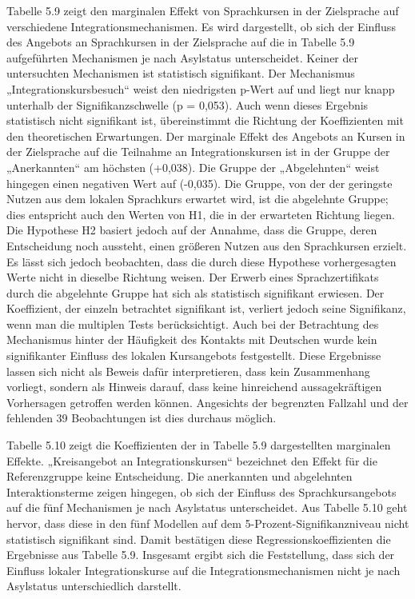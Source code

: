 Tabelle 5.9 zeigt den marginalen Effekt von Sprachkursen in der Zielsprache auf verschiedene Integrationsmechanismen. Es wird dargestellt, ob sich der Einfluss des Angebots an Sprachkursen in der Zielsprache auf die in Tabelle 5.9 aufgeführten Mechanismen je nach Asylstatus unterscheidet. Keiner der untersuchten Mechanismen ist statistisch signifikant. Der Mechanismus „Integrationskursbesuch“ weist den niedrigsten p-Wert auf und liegt nur knapp unterhalb der Signifikanzschwelle (p = 0,053). Auch wenn dieses Ergebnis statistisch nicht signifikant ist, übereinstimmt die Richtung der Koeffizienten mit den theoretischen Erwartungen. Der marginale Effekt des Angebots an Kursen in der Zielsprache auf die Teilnahme an Integrationskursen ist in der Gruppe der „Anerkannten“ am höchsten (+0,038). Die Gruppe der „Abgelehnten“ weist hingegen einen negativen Wert auf (-0,035). Die Gruppe, von der der geringste Nutzen aus dem lokalen Sprachkurs erwartet wird, ist die abgelehnte Gruppe; dies entspricht auch den Werten von H1, die in der erwarteten Richtung liegen. Die Hypothese H2 basiert jedoch auf der Annahme, dass die Gruppe, deren Entscheidung noch aussteht, einen größeren Nutzen aus den Sprachkursen erzielt. Es lässt sich jedoch beobachten, dass die durch diese Hypothese vorhergesagten Werte nicht in dieselbe Richtung weisen. Der Erwerb eines Sprachzertifikats durch die abgelehnte Gruppe hat sich als statistisch signifikant erwiesen. Der Koeffizient, der einzeln betrachtet signifikant ist, verliert jedoch seine Signifikanz, wenn man die multiplen Tests berücksichtigt. Auch bei der Betrachtung des Mechanismus hinter der Häufigkeit des Kontakts mit Deutschen wurde kein signifikanter Einfluss des lokalen Kursangebots festgestellt. Diese Ergebnisse lassen sich nicht als Beweis dafür interpretieren, dass kein Zusammenhang vorliegt, sondern als Hinweis darauf, dass keine hinreichend aussagekräftigen Vorhersagen getroffen werden können. Angesichts der begrenzten Fallzahl und der fehlenden 39 Beobachtungen ist dies durchaus möglich.



Tabelle 5.10 zeigt die Koeffizienten der in Tabelle 5.9 dargestellten marginalen Effekte. „Kreisangebot an Integrationskursen“ bezeichnet den Effekt für die Referenzgruppe keine Entscheidung. Die anerkannten und abgelehnten Interaktionsterme zeigen hingegen, ob sich der Einfluss des Sprachkursangebots auf die fünf Mechanismen je nach Asylstatus unterscheidet. Aus Tabelle 5.10 geht hervor, dass diese in den fünf Modellen auf dem 5-Prozent-Signifikanzniveau nicht statistisch signifikant sind. Damit bestätigen diese Regressionskoeffizienten die Ergebnisse aus Tabelle 5.9. Insgesamt ergibt sich die Feststellung, dass sich der Einfluss lokaler Integrationskurse auf die Integrationsmechanismen nicht je nach Asylstatus unterschiedlich darstellt.


